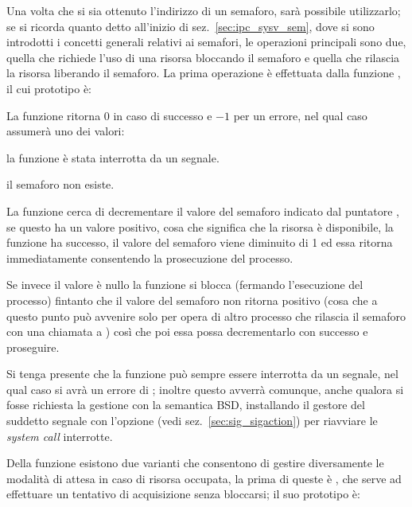 Una volta che si sia ottenuto l'indirizzo di un semaforo, sarà possibile
utilizzarlo; se si ricorda quanto detto all'inizio di
sez.~\ref{sec:ipc_sysv_sem}, dove si sono introdotti i concetti generali
relativi ai semafori, le operazioni principali sono due, quella che richiede
l'uso di una risorsa bloccando il semaforo e quella che rilascia la risorsa
liberando il semaforo. La prima operazione è effettuata dalla funzione
, il cui prototipo è:

\begin{funcproto}{

}

{La funzione ritorna $0$ in caso di successo e $-1$ per un errore, nel qual
  caso  assumerà uno dei valori:
  \begin{errlist}
    \item[\errcode{EINTR}] la funzione è stata interrotta da un segnale.
    \item[\errcode{EINVAL}] il semaforo  non esiste.
  \end{errlist}
}  
\end{funcproto}

La funzione cerca di decrementare il valore del semaforo indicato dal
puntatore , se questo ha un valore positivo, cosa che significa che
la risorsa è disponibile, la funzione ha successo, il valore del semaforo
viene diminuito di 1 ed essa ritorna immediatamente consentendo la
prosecuzione del processo.

Se invece il valore è nullo la funzione si blocca (fermando l'esecuzione del
processo) fintanto che il valore del semaforo non ritorna positivo (cosa che a
questo punto può avvenire solo per opera di altro processo che rilascia il
semaforo con una chiamata a ) così che poi essa possa
decrementarlo con successo e proseguire.

Si tenga presente che la funzione può sempre essere interrotta da un segnale,
nel qual caso si avrà un errore di ; inoltre questo avverrà
comunque, anche qualora si fosse richiesta la gestione con la semantica BSD,
installando il gestore del suddetto segnale con l'opzione 
(vedi sez.~\ref{sec:sig_sigaction}) per riavviare le \textit{system call}
interrotte.

Della funzione  esistono due varianti che consentono di
gestire diversamente le modalità di attesa in caso di risorsa occupata, la
prima di queste è , che serve ad effettuare un tentativo
di acquisizione senza bloccarsi; il suo prototipo è:

